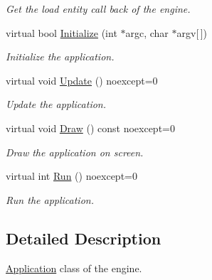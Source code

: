 \begin{DoxyCompactItemize}
\begin{DoxyCompactList}\small\item\em Get the load entity call back of the engine. \end{DoxyCompactList}\item 
\mbox{\label{class_blade_1_1_application_a5abbd8e3d830a6543f4abbc2d100c562}} 
virtual bool \hyperlink{class_blade_1_1_application_a5abbd8e3d830a6543f4abbc2d100c562}{Initialize} (int $\ast$argc, char $\ast$argv\mbox{[}$\,$\mbox{]})
\begin{DoxyCompactList}\small\item\em Initialize the application. \end{DoxyCompactList}\item 
\mbox{\label{class_blade_1_1_application_a18b70b1a66b3c639e723464a0f31cc5f}} 
virtual void \hyperlink{class_blade_1_1_application_a18b70b1a66b3c639e723464a0f31cc5f}{Update} () noexcept=0
\begin{DoxyCompactList}\small\item\em Update the application. \end{DoxyCompactList}\item 
\mbox{\label{class_blade_1_1_application_a660b728e2e7855548d02316c328da2f7}} 
virtual void \hyperlink{class_blade_1_1_application_a660b728e2e7855548d02316c328da2f7}{Draw} () const noexcept=0
\begin{DoxyCompactList}\small\item\em Draw the application on screen. \end{DoxyCompactList}\item 
\mbox{\label{class_blade_1_1_application_a969f20210bd185cc6912b7794a0eea5b}} 
virtual int \hyperlink{class_blade_1_1_application_a969f20210bd185cc6912b7794a0eea5b}{Run} () noexcept=0
\begin{DoxyCompactList}\small\item\em Run the application. \end{DoxyCompactList}\end{DoxyCompactItemize}


\subsection{Detailed Description}
\hyperlink{class_blade_1_1_application}{Application} class of the engine. 

